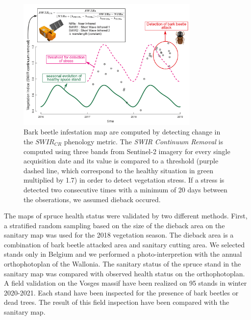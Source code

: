 \documentclass[3p,procedia]{elsarticle}
\begin{document}
\begin{figure}[htbp] 
	\centering
	\includegraphics[width=0.8\textwidth]{fctHarmo.png}
	\caption{Bark beetle infestation map are computed by detecting change in the $SWIR_{CR}$ phenology metric. The \textit{SWIR Continuum Removal} is computed using three bands from Sentinel-2 imagery for every single acquisition date and its value is compared to a threshold (purple dashed line, which correspond to the healthy situation in green multiplied by 1.7) in order to detect vegetation stress. If a stress is detected two consecutive times with a minimum of 20 days between the obserations, we assumed dieback occured.}
	\label{fig:harmo}
\end{figure}


The maps of spruce health status were validated by two different methods.
First, a stratified random sampling based on the size of the dieback area on the sanitary map was used for the 2018 vegetation season.
The dieback area is a combination of bark beetle attacked area and sanitary cutting area. 
We selected stands only in Belgium and we performed a photo-interpretion with the annual orthophotoplan of the Wallonia. The sanitary status of the spruce stand in the sanitary map was compared with observed health status on the orthophotoplan.
A field validation on the Vosges massif have been realized on 95 stands in winter 2020-2021.
Each stand have been inspected for the presence of bark beetles or dead trees. 
The result of this field inspection have been compared with the sanitary map. 
\end{document}
